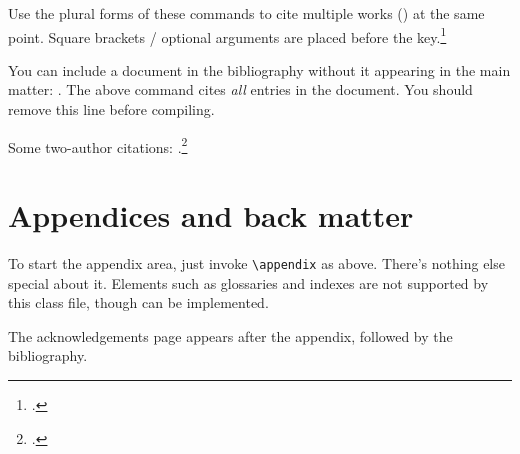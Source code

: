 \documentclass[embargoed]{grattan}
\begin{document}
Use the plural forms of these commands to cite multiple works (\textcites{Piketty2013}{Leigh-2013-BattlersBillionaires}) at the same point.
Square brackets / optional arguments are placed before the key.\footcites{AtkinsonStiglitz1976}[][42]{ABS-WagePriceIndex-Jun2017}


You can include a document in the bibliography without it appearing in the main matter: \nocite{*}.
The above command cites \emph{all} entries in the document. 
You should remove this line before compiling. 

Some two-author citations: \textcite{Norton2014Doubtfuldebtrising}.\footcites{DuckettBreadon-2014-Unlocking-skills}{Duckett-2016-Premium-policy-getting-more-from-PBS}{Norton2015Universityfeeswhat}{Norton2015cashnexushow}


\appendix

\chapter{Appendices and back matter}\label{chap:appendices}
To start the appendix area, just invoke \verb=\appendix= as above. 
There's nothing else special about it.
Elements such as glossaries and indexes are not supported by this class file, though can be implemented.

The acknowledgements page appears after the appendix, followed by the bibliography. 

\acknowledgementspage

\printbibliography
\end{document}
